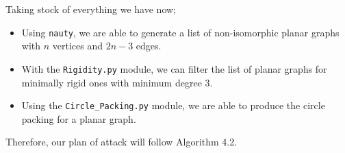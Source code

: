 \begin{flushleft}
Taking stock of everything we have now;
\begin{itemize}
    \item Using \texttt{nauty}, we are able to generate a list of non-isomorphic planar graphs with $n$ vertices and $2n-3$ edges.
    \vspace{-3mm}
    \item With the \texttt{Rigidity.py} module, we can filter the list of planar graphs for minimally rigid ones with minimum degree 3.
    \vspace{-3mm}
    \item Using the \texttt{Circle\_Packing.py} module, we are able to produce the circle packing for a planar graph.
\end{itemize}

Therefore, our plan of attack will follow Algorithm 4.2.
\end{flushleft}
